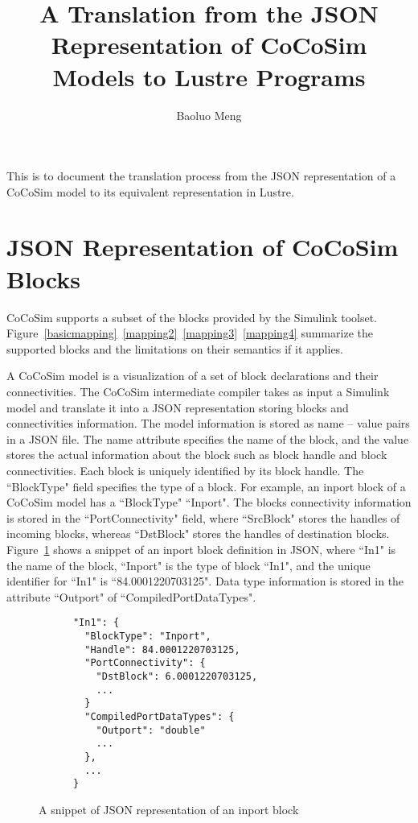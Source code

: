 \documentclass{article}
\begin{document}
\title{A Translation from the JSON Representation of CoCoSim Models to Lustre Programs}

\author{Baoluo Meng}


\maketitle

This is to document the translation process from the JSON representation of a CoCoSim model to its equivalent representation in Lustre.


\section{JSON Representation of CoCoSim Blocks}

CoCoSim supports a subset of the blocks provided by the Simulink toolset. Figure~\ref{basicmapping}~\ref{mapping2}~\ref{mapping3}~\ref{mapping4} summarize the supported blocks and the limitations on their semantics if it applies. 

A CoCoSim model is a visualization of a set of block declarations and their connectivities.
The CoCoSim intermediate compiler takes as input a Simulink model and translate it into a JSON representation storing blocks and connectivities information. 
The model information is stored as name -- value pairs in a JSON file. 
The name attribute specifies the name of the block, and the value stores the actual information about the block such as block handle and block connectivities. 
Each block is uniquely identified by its block handle.
The ``BlockType" field specifies the type of a block. 
For example, an inport block of a CoCoSim model has a ``BlockType" ``Inport".
The blocks connectivity information is stored in the ``PortConnectivity" field, where ``SrcBlock" stores the handles of incoming blocks, whereas ``DstBlock" stores the handles of destination blocks. 
Figure~\ref{jsoninport} shows a snippet of an inport block definition in JSON, 
where ``In1" is the name of the block, ``Inport" is the type of block ``In1", and the unique identifier for ``In1" is ``84.0001220703125". Data type information is stored in the attribute ``Outport" of ``CompiledPortDataTypes". 

\begin{figure}[ht]
\begin{lstlisting}
      "In1": {
        "BlockType": "Inport",
        "Handle": 84.0001220703125,
        "PortConnectivity": {
          "DstBlock": 6.0001220703125,
          ...
        }
        "CompiledPortDataTypes": {
          "Outport": "double"
          ...
        },
        ...        
      }
\end{lstlisting}        
\caption{A snippet of JSON representation of an inport block}
\label{jsoninport}
\end{figure}
\end{document}
